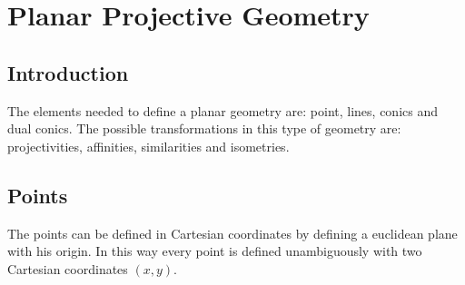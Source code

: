 \documentclass[12pt, a4paper]{report}
\newtheorem[style=M,bodystyle=\normalfont]{theorem}{Theorem}
\newtheorem[style=M,bodystyle=\normalfont]{corollary}{Corollary}
\newtheorem[style=M,bodystyle=\normalfont]{lemma}{Lemma}
\newtheorem[style=M,bodystyle=\normalfont]{definition}{Definition}
\begin{document}
\newpage

\chapter{Planar Projective Geometry}
    \section{Introduction}
    The elements needed to define a planar geometry are: point, lines, conics and dual conics. The possible transformations in this type of geometry are: projectivities, 
    affinities, similarities and isometries. 

    \section{Points}
    The points can be defined in Cartesian coordinates by defining a euclidean plane with his origin. In this way every point is defined unambiguously with two Cartesian 
    coordinates $(x,y)$. 
\end{document}

